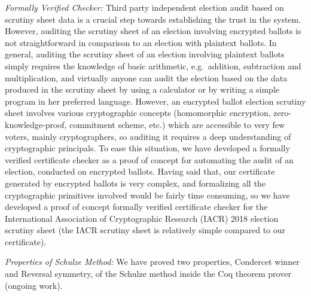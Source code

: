 \noindent 
\textit{Formally Verified Checker:} Third party independent election audit based on scrutiny sheet data is a crucial step towards 
establishing the trust in the system.   However, auditing the scrutiny sheet of an election involving encrypted ballots
is not straightforward in comparison to an election with plaintext ballots. 
In general, auditing the scrutiny sheet of an election involving 
plaintext ballots simply requires the knowledge of basic arithmetic, e.g.~addition, subtraction and multiplication, 
and virtually anyone can audit the election based on the data produced in the scrutiny sheet by
using a calculator or by writing a simple program in her preferred language. 
However, an encrypted ballot election scrutiny sheet involves various
cryptographic concepts (homomorphic encryption, zero-knowledge-proof, commitment scheme, etc.) 
which are accessible to very few voters, mainly cryptographers,  so auditing it 
requires a deep understanding of cryptographic principals. To ease this situation, we have developed a formally verified 
certificate checker as a proof of concept for automating the audit of an election, conducted on encrypted ballots. 
Having said that,  our certificate generated by encrypted ballots is very complex, and formalizing all the cryptographic 
primitives involved would be fairly time consuming, so we have developed a proof of concept 
formally verified certificate checker for the International Association of Cryptographic Research (IACR) 2018 election
scrutiny sheet (the IACR scrutiny sheet is relatively simple compared to our certificate).

\noindent
\textit{Properties of Schulze Method:} We have proved two properties, Condercet winner and Reversal symmetry, 
of the Schulze method inside the Coq theorem prover (ongoing work).
 

